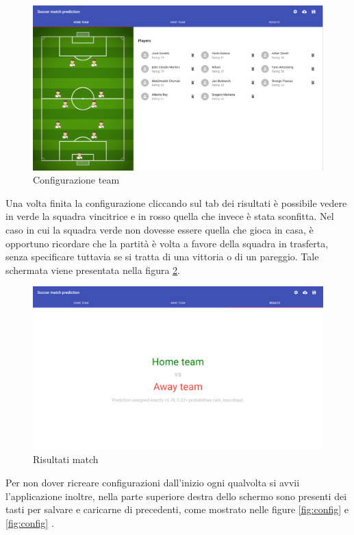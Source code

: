 \documentclass[hidelinks, 12pt]{article}
\begin{document}
\begin{figure}[H]
	\centering
	\includegraphics[scale=0.35]{images/07_02_team_config.png}
	\caption[Configurazione team]{Configurazione team}
	\label{fig:team_config}
\end{figure}

Una volta finita la configurazione cliccando sul tab dei risultati è possibile vedere in verde la squadra vincitrice e in rosso quella che invece è stata sconfitta. Nel caso in cui la squadra verde non dovesse essere quella che gioca in casa, è opportuno ricordare che la partità è volta a favore della squadra in trasferta, senza specificare tuttavia se si tratta di una vittoria o di un pareggio. Tale schermata viene presentata nella figura \ref{fig:match_result}. 

\begin{figure}[H]
	\centering
	\includegraphics[scale=0.35]{images/07_02_match_result.png}
	\caption[Risultati match]{Risultati match}
	\label{fig:match_result}
\end{figure}

Per non dover ricreare configurazioni dall'inizio ogni qualvolta si avvii l'applicazione inoltre, nella parte superiore destra dello schermo sono presenti dei tasti per salvare e caricarne di precedenti, come mostrato nelle figure \ref{fig:config}  e \ref{fig:config} .
\end{document}
